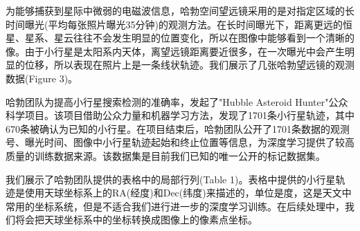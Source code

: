 \documentclass[12pt,a4paper]{article}%
\begin{document}
为能够捕获到星际中微弱的电磁波信息，哈勃空间望远镜采用的是对指定区域的长时间曝光(平均每张照片曝光35分钟)的观测方法。在长时间曝光下，距离更远的恒星、星系、星云往往不会发生明显的位置变化，所以在图像中能够看到一个清晰的像。由于小行星是太阳系内天体，离望远镜距离要近很多，在一次曝光中会产生明显的位移，所以表现在照片上是一条线状轨迹。我们展示了几张哈勃望远镜的观测数据(Figure 3)。

哈勃团队为提高小行星搜索检测的准确率，发起了"Hubble Asteroid Hunter"公众科学项目。该项目借助公众力量和机器学习方法，发现了1701条小行星轨迹，其中670条被确认为已知的小行星。在项目结束后，哈勃团队公开了1701条数据的观测号、曝光时间、图像中小行星轨迹起始和终止位置等信息，为深度学习提供了较高质量的训练数据来源。该数据集是目前我们已知的唯一公开的标记数据集。

我们展示了哈勃团队提供的表格中的局部行列(Table 1)。表格中提供的小行星轨迹是使用天球坐标系上的RA(经度)和Dec(纬度)来描述的，单位是度，这是天文中常用的坐标系统，但是不适合我们进行进一步的深度学习训练。在后续处理中，我们将会把天球坐标系中的坐标转换成图像上的像素点坐标。
\end{document}
